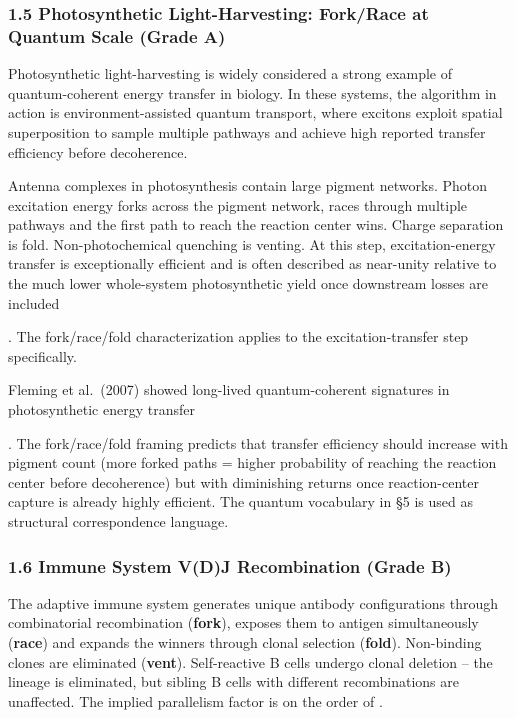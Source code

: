 \documentclass[
]{article}
\begin{document}
\subsubsection{\texorpdfstring{\textbf{1.5 Photosynthetic
Light-Harvesting: Fork/Race at Quantum Scale (Grade
A)}}{1.5 Photosynthetic Light-Harvesting: Fork/Race at Quantum Scale (Grade A)}}\label{photosynthetic-light-harvesting-forkrace-at-quantum-scale-grade-a}

Photosynthetic light-harvesting is widely considered a strong example of
quantum-coherent energy transfer in biology. In these systems, the
algorithm in action is environment-assisted quantum transport, where
excitons exploit spatial superposition to sample multiple pathways and
achieve high reported transfer efficiency before decoherence.

Antenna complexes in photosynthesis contain large pigment networks.
Photon excitation energy forks across the pigment network, races through
multiple pathways and the first path to reach the reaction center wins.
Charge separation is fold. Non-photochemical quenching is venting. At
this step, excitation-energy transfer is exceptionally efficient and is
often described as near-unity relative to the much lower whole-system
photosynthetic yield once downstream losses are included

. The fork/race/fold characterization applies to the excitation-transfer
step specifically.

Fleming et al.~(2007) showed long-lived quantum-coherent signatures in
photosynthetic energy transfer

. The fork/race/fold framing predicts that transfer efficiency should
increase with pigment count (more forked paths = higher probability of
reaching the reaction center before decoherence) but with diminishing
returns once reaction-center capture is already highly efficient. The
quantum vocabulary in §5 is used as structural correspondence language.

\subsubsection{\texorpdfstring{\textbf{1.6 Immune System V(D)J
Recombination (Grade
B)}}{1.6 Immune System V(D)J Recombination (Grade B)}}\label{immune-system-vdj-recombination-grade-b}

The adaptive immune system generates unique antibody configurations
through combinatorial recombination (\textbf{fork}), exposes them to
antigen simultaneously (\textbf{race}) and expands the winners through
clonal selection (\textbf{fold}). Non-binding clones are eliminated
(\textbf{vent}). Self-reactive B cells undergo clonal deletion -- the
lineage is eliminated, but sibling B cells with different recombinations
are unaffected. The implied parallelism factor is on the order of .
\end{document}
